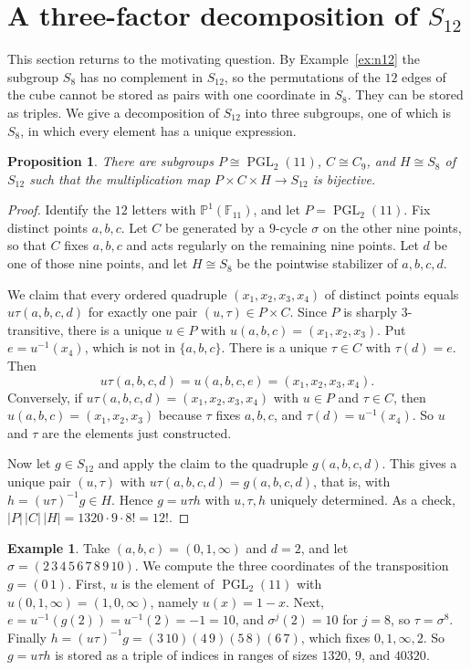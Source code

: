 \documentclass[12pt,letterpaper]{article}
\numberwithin{equation}{section}
\newtheorem{proposition}[theorem]{Proposition}
\theoremstyle{definition}
\newtheorem{example}[theorem]{Example}
\DeclareMathOperator{\pgll}{PGL}
\begin{document}
\section{A three-factor decomposition of \texorpdfstring{$S_{12}$}{S12}}\label{sec:three}
This section returns to the motivating question. By Example~\ref{ex:n12} the subgroup $S_8$ has no complement in $S_{12}$, so the permutations of the $12$ edges of the cube cannot be stored as pairs with one coordinate in $S_8$. They can be stored as triples. We give a decomposition of $S_{12}$ into three subgroups, one of which is $S_8$, in which every element has a unique expression.
\begin{proposition}\label{prop:12}
There are subgroups $P\cong\pgll_2(11)$, $C\cong C_9$, and $H\cong S_8$ of $S_{12}$ such that the multiplication map $P\times C\times H\to S_{12}$ is bijective.
\end{proposition}
\begin{proof}
Identify the $12$ letters with $\mathbb P^1(\mathbb F_{11})$, and let $P=\pgll_2(11)$. Fix distinct points $a,b,c$. Let $C$ be generated by a $9$-cycle $\sigma$ on the other nine points, so that $C$ fixes $a,b,c$ and acts regularly on the remaining nine points. Let $d$ be one of those nine points, and let $H\cong S_8$ be the pointwise stabilizer of $a,b,c,d$.

We claim that every ordered quadruple $(x_1,x_2,x_3,x_4)$ of distinct points equals $u\tau(a,b,c,d)$ for exactly one pair $(u,\tau)\in P\times C$. Since $P$ is sharply $3$-transitive, there is a unique $u\in P$ with $u(a,b,c)=(x_1,x_2,x_3)$. Put $e=u^{-1}(x_4)$, which is not in $\{a,b,c\}$. There is a unique $\tau\in C$ with $\tau(d)=e$. Then
\[
u\tau(a,b,c,d)=u(a,b,c,e)=(x_1,x_2,x_3,x_4).
\]
Conversely, if $u\tau(a,b,c,d)=(x_1,x_2,x_3,x_4)$ with $u\in P$ and $\tau\in C$, then $u(a,b,c)=(x_1,x_2,x_3)$ because $\tau$ fixes $a,b,c$, and $\tau(d)=u^{-1}(x_4)$. So $u$ and $\tau$ are the elements just constructed.

Now let $g\in S_{12}$ and apply the claim to the quadruple $g(a,b,c,d)$. This gives a unique pair $(u,\tau)$ with $u\tau(a,b,c,d)=g(a,b,c,d)$, that is, with $h=(u\tau)^{-1}g\in H$. Hence $g=u\tau h$ with $u,\tau,h$ uniquely determined. As a check, $|P|\,|C|\,|H|=1320\cdot9\cdot8!=12!$.
\end{proof}
\begin{example}\label{ex:coords}
Take $(a,b,c)=(0,1,\infty)$ and $d=2$, and let $\sigma=(2\,3\,4\,5\,6\,7\,8\,9\,10)$. We compute the three coordinates of the transposition $g=(0\,1)$. First, $u$ is the element of $\pgll_2(11)$ with $u(0,1,\infty)=(1,0,\infty)$, namely $u(x)=1-x$. Next, $e=u^{-1}(g(2))=u^{-1}(2)=-1=10$, and $\sigma^{j}(2)=10$ for $j=8$, so $\tau=\sigma^8$. Finally $h=(u\tau)^{-1}g=(3\,10)(4\,9)(5\,8)(6\,7)$, which fixes $0,1,\infty,2$. So $g=u\tau h$ is stored as a triple of indices in ranges of sizes $1320$, $9$, and $40320$.
\end{example}
\end{document}
